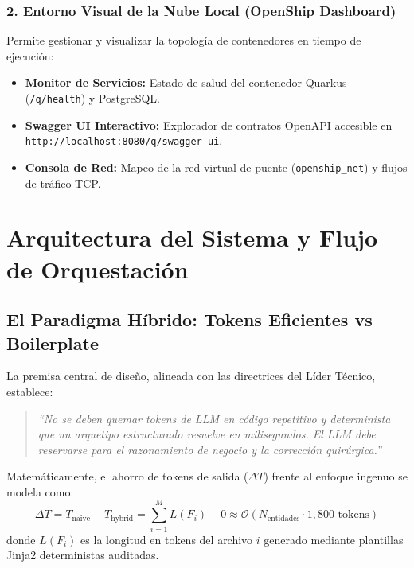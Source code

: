 \documentclass[11pt,a4paper]{report}
\begin{document}
\subsection{2. Entorno Visual de la Nube Local (OpenShip Dashboard)}
Permite gestionar y visualizar la topología de contenedores en tiempo de ejecución:
\begin{itemize}[leftmargin=1.5cm]
    \item \textbf{Monitor de Servicios:} Estado de salud del contenedor Quarkus (\texttt{/q/health}) y PostgreSQL.
    \item \textbf{Swagger UI Interactivo:} Explorador de contratos OpenAPI accesible en \texttt{http://localhost:8080/q/swagger-ui}.
    \item \textbf{Consola de Red:} Mapeo de la red virtual de puente (\texttt{openship\_net}) y flujos de tráfico TCP.
\end{itemize}

\newpage

\chapter{Arquitectura del Sistema y Flujo de Orquestación}

\section{El Paradigma Híbrido: Tokens Eficientes vs Boilerplate}
La premisa central de diseño, alineada con las directrices del Líder Técnico, establece:
\begin{quote}
\textit{``No se deben quemar tokens de LLM en código repetitivo y determinista que un arquetipo estructurado resuelve en milisegundos. El LLM debe reservarse para el razonamiento de negocio y la corrección quirúrgica.''}
\end{quote}

Matemáticamente, el ahorro de tokens de salida ($\Delta T$) frente al enfoque ingenuo se modela como:
\begin{equation}
\Delta T = T_{\text{naive}} - T_{\text{hybrid}} = \sum_{i=1}^{M} L(F_i) - 0 \approx \mathcal{O}(N_{\text{entidades}} \cdot 1,800 \text{ tokens})
\end{equation}
donde $L(F_i)$ es la longitud en tokens del archivo $i$ generado mediante plantillas Jinja2 deterministas auditadas.
\end{document}
